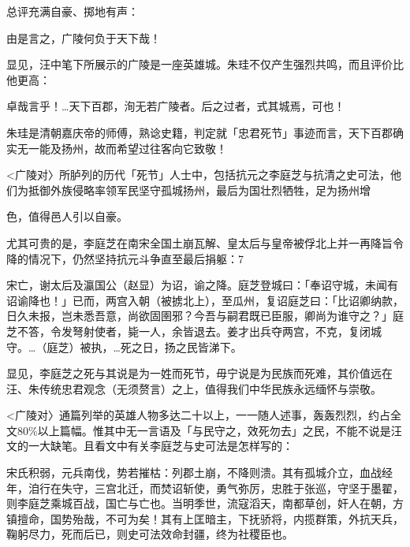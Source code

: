 总评充满自豪、掷地有声：

\begin{BookQuote}
由是言之，广陵何负于天下哉！
\end{BookQuote}

显见，汪中笔下所展示的广陵是一座英雄城。朱珪不仅产生强烈共鸣，而且评价比他更高：

\begin{BookQuote}
卓哉言乎！…天下百郡，洵无若广陵者。后之过者，式其城焉，可也！
\end{BookQuote}

朱珪是清朝嘉庆帝的师傅，熟谂史籍，判定就「忠君死节」事迹而言，天下百郡确实无一能及扬州，故而希望过往客向它致敬！

<广陵对〉所胪列的历代「死节」人士中，包括抗元之李庭芝与抗清之史可法，他们为抵御外族侵略率领军民坚守孤城扬州，最后为国壮烈牺牲，足为扬州增

\vfill
\begin{BookNotes}
\end{BookNotes}

\noindent 色，值得邑人引以自豪。

尤其可贵的是，李庭芝在南宋全国土崩瓦解、皇太后与皇帝被俘北上并一再降旨令降的情况下，仍然坚持抗元斗争直至最后捐躯：7

\begin{BookQuote}
宋亡，谢太后及瀛国公（赵显）为诏，谕之降。庭芝登城曰：「奉诏守城，未闻有诏谕降也！」已而，两宫入朝（被掳北上），至瓜州，复诏庭芝曰：「比诏卿纳款，日久未报，岂未悉吾意，尚欲固圉邪？今吾与嗣君既已臣服，卿尚为谁守之？」庭芝不答，令发弩射使者，毙一人，余皆退去。姜才出兵夺两宫，不克，复闭城守。…（庭芝）被执，…死之日，扬之民皆涕下。
\end{BookQuote}

显见，李庭芝之死与其说是为一姓而死节，毋宁说是为民族而死难，其价值远在汪、朱传统忠君观念（无须赘言）之上，值得我们中华民族永远缅怀与崇敬。

<广陵对〉通篇列举的英雄人物多达二十以上，一一随人述事，轰轰烈烈，约占全文80\%以上篇幅。惟其中无一言语及「与民守之，效死勿去」之民，不能不说是汪文的一大缺笔。且看文中有关李庭芝与史可法是怎样写的：

\begin{BookQuote}
宋氏积弱，元兵南伐，势若摧枯：列郡土崩，不降则溃。其有孤城介立，血战经年，洎行在失守，三宫北迁，而焚诏斩使，勇气弥厉，忠胜于张巡，守坚于墨翟，则李庭芝乘城百战，国亡与亡也。当明季世，流寇滔天，南都草创，奸人在朝，方镇擅命，国势殆哉，不可为矣！其有上匡暗主，下抚骄将，内揽群策，外抗天兵，鞠躬尽力，死而后已，则史可法效命封疆，终为社稷臣也。
\end{BookQuote}

